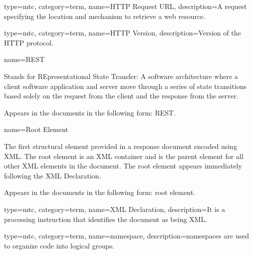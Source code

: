 {
  type=mtc,
  category=term,
  name={HTTP Request URL},
  description={A request specifying the location and mechanism to retrieve a web resource.}
}

{
  type=mtc,
  category=term,
  name={HTTP Version},
  description={Version of the HTTP protocol.}
}


{
  name={\normalfont REST}
}
{
	Stands for REpresentational State Transfer:  A software architecture where a client software application and server move through a series of state transitions based solely on the request from the client and the response from the server. 

	Appears in the documents in the following form: REST.
}


{
  name={Root Element}
}
{
	The first \gls{structural element} provided in a \gls{response document} encoded using XML.  The \gls{root element} is an XML container and is the \gls{parent element} for all other XML elements in the document.  The \gls{root element} appears immediately following the XML Declaration.

	Appears in the documents in the following form: \gls{root element}.
}

{
  type=mtc,
  category=term,
  name={XML Declaration},
  description={It is a processing instruction that identifies the document as being XML.}
}

{
  type=mtc,
  category=term,
  name={namespace},
  description={\glspl{namespace} are used to organize code into logical groups.}
}

